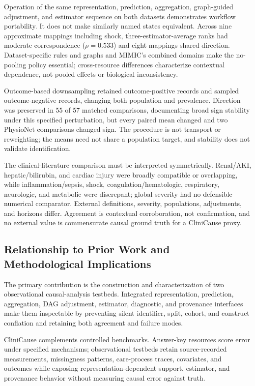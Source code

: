 Operation of the same representation, prediction, aggregation, graph-guided adjustment, and estimator sequence on both datasets demonstrates workflow portability.  It does not make similarly named states equivalent.  Across nine approximate mappings including shock, three-estimator-average ranks had moderate correspondence ($\rho=0.533$) and eight mappings shared direction.  Dataset-specific rules and graphs and MIMIC's combined domains make the no-pooling policy essential; cross-resource differences characterize contextual dependence, not pooled effects or biological inconsistency.

Outcome-based downsampling retained outcome-positive records and sampled outcome-negative records, changing both population and prevalence.  Direction was preserved in 55 of 57 matched comparisons, documenting broad sign stability under this specified perturbation, but every paired mean changed and two PhysioNet comparisons changed sign.  The procedure is not transport or reweighting; the means need not share a population target, and stability does not validate identification.

The clinical-literature comparison must be interpreted symmetrically.  Renal/AKI, hepatic/bilirubin, and cardiac injury were broadly compatible or overlapping, while inflammation/sepsis, shock, coagulation/hematologic, respiratory, neurologic, and metabolic were discrepant; global severity had no defensible numerical comparator.  External definitions, severity, populations, adjustments, and horizons differ.  Agreement is contextual corroboration, not confirmation, and no external value is commensurate causal ground truth for a CliniCause proxy.

\subsection{Relationship to Prior Work and Methodological Implications}
\label{subsec:discussion:prior-work-implications}

The primary contribution is the construction and characterization of two observational causal-analysis testbeds.  Integrated representation, prediction, aggregation, DAG adjustment, estimator, diagnostic, and provenance interfaces make them inspectable by preventing silent identifier, split, cohort, and construct conflation and retaining both agreement and failure modes.

CliniCause complements controlled benchmarks.  Answer-key resources score error under specified mechanisms; observational testbeds retain source-recorded measurements, missingness patterns, care-process traces, covariates, and outcomes while exposing representation-dependent support, estimator, and provenance behavior without measuring causal error against truth.

